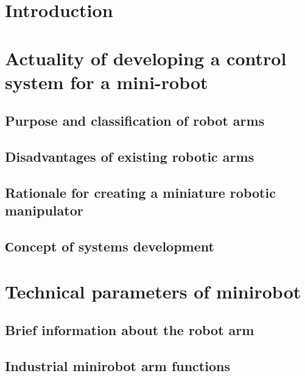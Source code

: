 
\section*{Introduction}


\section{ Actuality of developing a control system for a mini-robot}


\subsection{Purpose and classification of robot arms} 



\subsection{Disadvantages of existing robotic arms}


\subsection{Rationale for creating a miniature robotic manipulator}


\subsection{Сoncept of systems development}


\section{Technical parameters of minirobot}
\subsection{Brief information about the robot arm} 

\subsection{Industrial minirobot arm functions}  
